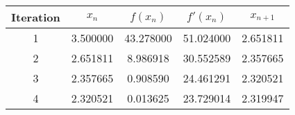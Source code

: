 \begin{tabular}{|c|c|c|c|c|}
\hline
Iteration & $x_n$ & $f(x_n)$ & $f'(x_n)$ & $x_{n+1}$ \\
\hline
1 & 3.500000 & 43.278000 & 51.024000 & 2.651811 \\
\hline
2 & 2.651811 & 8.986918 & 30.552589 & 2.357665 \\
\hline
3 & 2.357665 & 0.908590 & 24.461291 & 2.320521 \\
\hline
4 & 2.320521 & 0.013625 & 23.729014 & 2.319947 \\
\hline
\end{tabular}